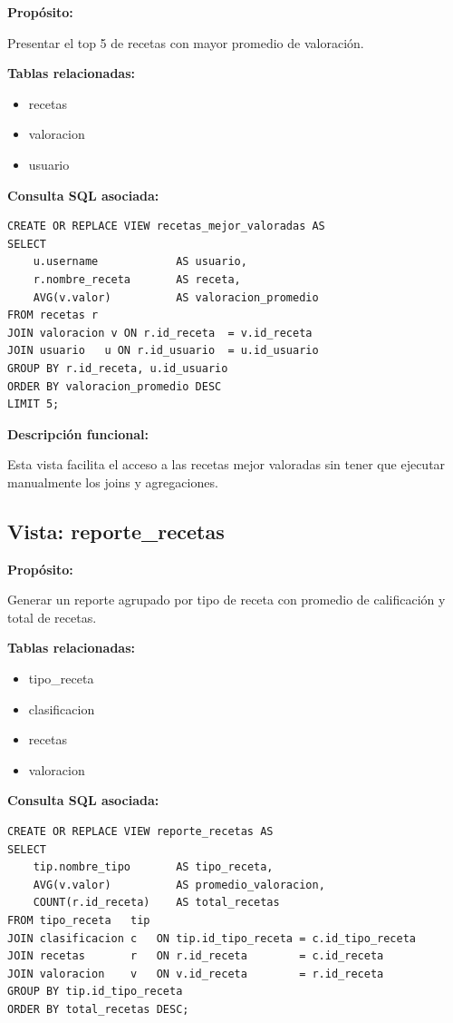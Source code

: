 \documentclass[12pt,a4paper]{article}
\begin{document}
\textbf{Propósito:}

Presentar el top 5 de recetas con mayor promedio de valoración.

\textbf{Tablas relacionadas:}
\begin{itemize}
    \item recetas
    \item valoracion
    \item usuario
\end{itemize}

\textbf{Consulta SQL asociada:}
\begin{verbatim}
CREATE OR REPLACE VIEW recetas_mejor_valoradas AS
SELECT
    u.username            AS usuario,
    r.nombre_receta       AS receta,
    AVG(v.valor)          AS valoracion_promedio
FROM recetas r
JOIN valoracion v ON r.id_receta  = v.id_receta
JOIN usuario   u ON r.id_usuario  = u.id_usuario
GROUP BY r.id_receta, u.id_usuario
ORDER BY valoracion_promedio DESC
LIMIT 5;
\end{verbatim}

\textbf{Descripción funcional:}

Esta vista facilita el acceso a las recetas mejor valoradas sin tener que ejecutar manualmente los joins y agregaciones.

\subsection{Vista: reporte\_recetas}

\textbf{Propósito:}

Generar un reporte agrupado por tipo de receta con promedio de calificación y total de recetas.

\textbf{Tablas relacionadas:}
\begin{itemize}
    \item tipo\_receta
    \item clasificacion
    \item recetas
    \item valoracion
\end{itemize}

\textbf{Consulta SQL asociada:}
\begin{verbatim}
CREATE OR REPLACE VIEW reporte_recetas AS
SELECT
    tip.nombre_tipo       AS tipo_receta,
    AVG(v.valor)          AS promedio_valoracion,
    COUNT(r.id_receta)    AS total_recetas
FROM tipo_receta   tip
JOIN clasificacion c   ON tip.id_tipo_receta = c.id_tipo_receta
JOIN recetas       r   ON r.id_receta        = c.id_receta
JOIN valoracion    v   ON v.id_receta        = r.id_receta
GROUP BY tip.id_tipo_receta
ORDER BY total_recetas DESC;
\end{verbatim}
\end{document}
